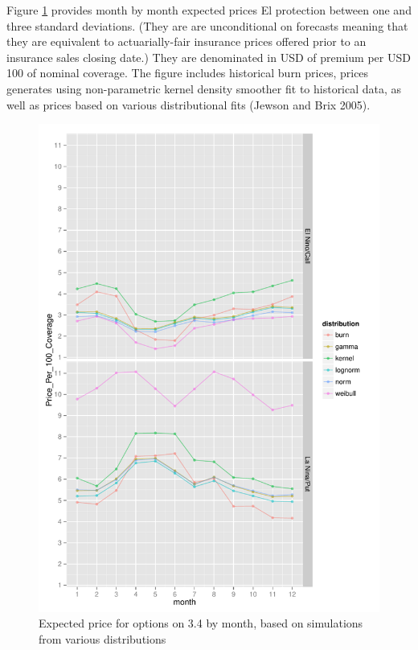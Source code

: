 \documentclass[article]{jss}
\begin{document}
Figure \ref{fig:optionPricesWithVariousDistMonth} provides month by
month expected prices El  protection between one and three
standard deviations. (They are are unconditional on forecasts meaning
that they are equivalent to actuarially-fair insurance prices offered
prior to an insurance sales closing date.) They are denominated in USD
of premium per USD 100 of nominal coverage. The figure includes
historical burn prices, prices generates using non-parametric kernel
density smoother fit to historical data, as well as prices based on
various distributional fits (Jewson and Brix 2005).

\begin{figure}[!htbp]
  \includegraphics[width=\linewidth]{img/optionPricesWithVariousDistMonth.pdf}
  \caption{Expected price for options on  3.4 by month, based on simulations from various distributions}
   \label{fig:optionPricesWithVariousDistMonth}
\end{figure}
\end{document}
